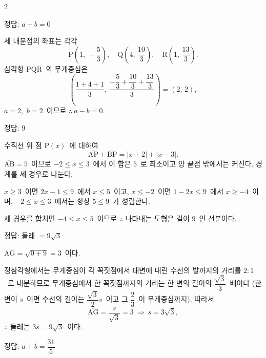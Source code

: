 \documentclass[10pt,fleqn]{article}   %
\begin{document}
\begin{multicols*}{2}
\begin{dmanswerbox}
정답: $a-b=0$
\end{dmanswerbox}

세 내분점의 좌표는 각각
$$\mathrm{P}\!\left(1,\,-\dfrac{5}{3}\right),\quad \mathrm{Q}\!\left(4,\,\dfrac{10}{3}\right),\quad \mathrm{R}\!\left(1,\,\dfrac{13}{3}\right).$$
삼각형 $\mathrm{PQR}$\ 의 무게중심은
\[ \left( \dfrac{1+4+1}{3},\ \dfrac{-\dfrac{5}{3}+\dfrac{10}{3}+\dfrac{13}{3}}{3} \right) = (2,\,2), \]
$a=2$,\ $b=2$\ 이므로 $\therefore\ a - b = 0$.
\begin{dmanswerbox}
정답: $9$
\end{dmanswerbox}

수직선 위 점 $\mathrm{P}(x)$\ 에 대하여
\[ \overline{\mathrm{AP}} + \overline{\mathrm{BP}} = |x+2| + |x-3|. \]
$\overline{\mathrm{AB}}=5$\ 이므로 $-2\le x\le 3$\ 에서 이 합은 $5$\ 로 최소이고 양 끝점 밖에서는 커진다. 경계를 세 경우로 나눈다.

$x\ge 3$\ 이면 $2x-1\le 9$\ 에서 $x\le 5$\ 이고, $x\le -2$\ 이면 $1-2x\le 9$\ 에서 $x\ge -4$\ 이며, $-2\le x\le 3$\ 에서는 항상 $5\le 9$\ 가 성립한다.

세 경우를 합치면 $-4\le x\le 5$\ 이므로 $\therefore$ 나타내는 도형은 길이 $9$\ 인 선분이다.
\begin{dmanswerbox}
정답: 둘레 $=9\sqrt{3}$
\end{dmanswerbox}

$\overline{\mathrm{AG}} = \sqrt{0+9} = 3$\ 이다.

정삼각형에서는 무게중심이 각 꼭짓점에서 대변에 내린 수선의 발까지의 거리를 $2:1$\ 로 내분하므로 무게중심에서 한 꼭짓점까지의 거리는 한 변의 길이의 $\dfrac{\sqrt{3}}{3}$\ 배이다 (한 변이 $s$\ 이면 수선의 길이는 $\dfrac{\sqrt{3}}{2}s$\ 이고 그 $\dfrac{2}{3}$\ 이 무게중심까지). 따라서
\[ \overline{\mathrm{AG}} = \dfrac{s}{\sqrt{3}} = 3 \ \Longrightarrow\ s = 3\sqrt{3}, \]
$\therefore$ 둘레는 $3s = 9\sqrt{3}$\ 이다.
\begin{dmanswerbox}
정답: $a+b=\dfrac{31}{5}$
\end{dmanswerbox}


\end{multicols*}
\end{document}
